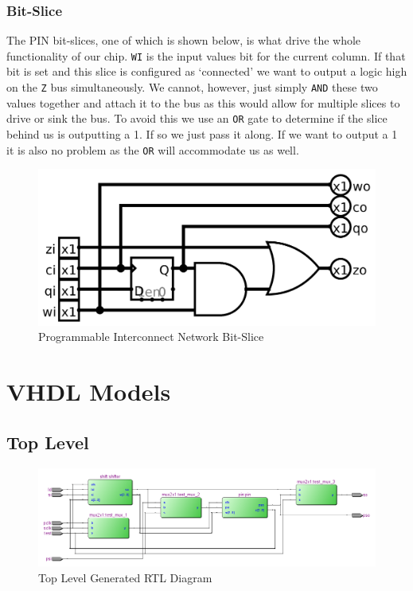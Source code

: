        \subsubsection{Bit-Slice}
        The PIN bit-slices, one of which is shown below, is what drive the
        whole functionality of our chip. \texttt{WI} is the input values bit
        for the current column. If that bit is set and this slice is configured
        as `connected' we want to output a logic high on the \texttt{Z} bus
        simultaneously. We cannot, however, just simply \texttt{AND} these two
        values together and attach it to the bus as this would allow for
        multiple slices to drive or sink the bus. To avoid this we use an
        \texttt{OR} gate to determine if the slice behind us is outputting a 1.
        If so we just pass it along.  If we want to output a 1 it is also no
        problem as the \texttt{OR} will accommodate us as well.
        \begin{figure}[H]
            \centering
            \includegraphics[width=0.75\linewidth]{../../logisim/pin_slice.png}
            \caption{Programmable Interconnect Network Bit-Slice}
        \end{figure}


\section{VHDL Models}
    \subsection{Top Level}
        
        \begin{figure}[H]
            \centering
            \includegraphics[width=\linewidth]{../../doc/rtl_pics/top_rtl.png}
            \caption{Top Level Generated RTL Diagram}
        \end{figure}
